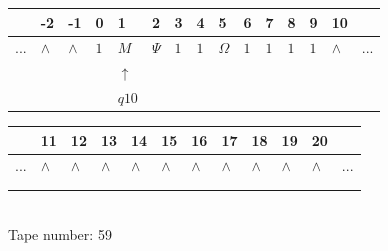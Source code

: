 \documentclass[11pt]{article}
\begin{document}
\begin{table}[H]
\centering
\begin{tabular}{lllllllllllllll}
 & -2 & -1 & 0 & 1 & 2 & 3 & 4 & 5 & 6 & 7 & 8 & 9 & 10 & \\
\hline
$...$ & \multicolumn{1}{|l|}{$\wedge$} & \multicolumn{1}{|l|}{$\wedge$} & \multicolumn{1}{|l|}{$1$} & \multicolumn{1}{|l|}{$M$} & \multicolumn{1}{|l|}{$\Psi$} & \multicolumn{1}{|l|}{$1$} & \multicolumn{1}{|l|}{$1$} & \multicolumn{1}{|l|}{$\Omega$} & \multicolumn{1}{|l|}{$1$} & \multicolumn{1}{|l|}{$1$} & \multicolumn{1}{|l|}{$1$} & \multicolumn{1}{|l|}{$1$} & \multicolumn{1}{|l|}{$\wedge$} & $...$\\
\hline
&  &  &  & $\uparrow$ &  &  &  &  &  &  &  &  &  &  \\
&  &  &  & $ q10 $ &  &  &  &  &  &  &  &  &  &  \\
\end{tabular}
\begin{tabular}{llllllllllll}
 & 11 & 12 & 13 & 14 & 15 & 16 & 17 & 18 & 19 & 20 & \\
\hline
$...$ & \multicolumn{1}{|l|}{$\wedge$} & \multicolumn{1}{|l|}{$\wedge$} & \multicolumn{1}{|l|}{$\wedge$} & \multicolumn{1}{|l|}{$\wedge$} & \multicolumn{1}{|l|}{$\wedge$} & \multicolumn{1}{|l|}{$\wedge$} & \multicolumn{1}{|l|}{$\wedge$} & \multicolumn{1}{|l|}{$\wedge$} & \multicolumn{1}{|l|}{$\wedge$} & \multicolumn{1}{|l|}{$\wedge$} & $...$\\
\hline
&  &  &  &  &  &  &  &  &  &  &  \\
&  &  &  &  &  &  &  &  &  &  &  \\
\end{tabular}
\\
Tape number: 59
\noindent\makebox[\linewidth]{\hdashrule{\textwidth}{1pt}{1pt}}\end{table}
\clearpage
\end{document}
